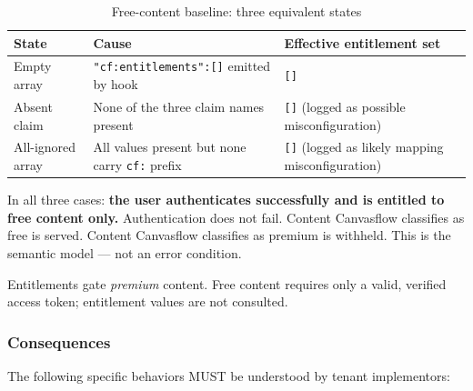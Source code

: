 \begin{table}[htbp]
\centering
\begin{tabularx}{\textwidth}{@{ }p{1.3cm}Xp{3cm}@{}}
\toprule
\textbf{State} & \textbf{Cause} & \textbf{Effective entitlement set} \\
\midrule
Empty array & \texttt{"cf:entitlements":[]} emitted by hook & \texttt{[]} \\[4pt]
Absent claim & None of the three claim names present & \texttt{[]} (logged as possible misconfiguration) \\[4pt]
All-ignored array & All values present but none carry \texttt{cf:} prefix & \texttt{[]} (logged as likely mapping misconfiguration) \\
\bottomrule
\end{tabularx}
\caption{Free-content baseline: three equivalent states}
\end{table}

In all three cases: \textbf{the user authenticates successfully and is entitled to free
content only.} Authentication does not fail. Content Canvasflow classifies as free is
served. Content Canvasflow classifies as premium is withheld. This is the semantic model
--- not an error condition.

Entitlements gate \emph{premium} content. Free content requires only a valid, verified
access token; entitlement values are not consulted.

\subsubsection{Consequences}

The following specific behaviors MUST be understood by tenant implementors:

